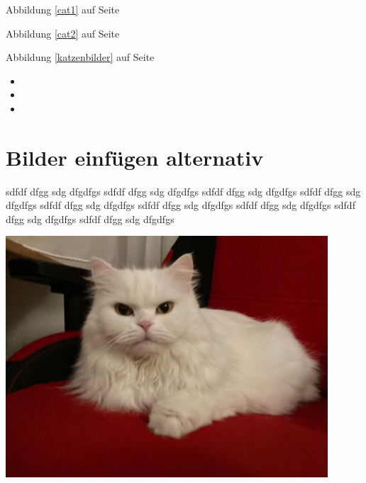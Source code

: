 \documentclass[12pt,ngerman,parskip=half]{scrreprt}
\begin{document}
Abbildung \ref{cat1} auf Seite \pageref{katzenbilder}

Abbildung \ref{cat2} auf Seite \pageref{katzenbilder}

Abbildung \ref{katzenbilder} auf Seite \pageref{katzenbilder}



\the\textwidth

\the\linewidth

\the\columnwidth


\begin{itemize}
	\item \the\textwidth
	\item \the\linewidth
	\item \the\columnwidth
\end{itemize}


\chapter{Bilder einfügen alternativ}

\blindtext  sdfdf dfgg sdg dfgdfgs sdfdf dfgg sdg dfgdfgs sdfdf dfgg sdg dfgdfgs sdfdf dfgg sdg dfgdfgs sdfdf dfgg sdg dfgdfgs sdfdf dfgg sdg dfgdfgs sdfdf dfgg sdg dfgdfgs sdfdf dfgg sdg dfgdfgs sdfdf dfgg sdg dfgdfgs 

\begin{minipage}{\textwidth}
\begin{center}
\includegraphics[width=0.9\textwidth,angle=-5]{Bilder/Katze}
\end{center}
\end{minipage}
\end{document}
